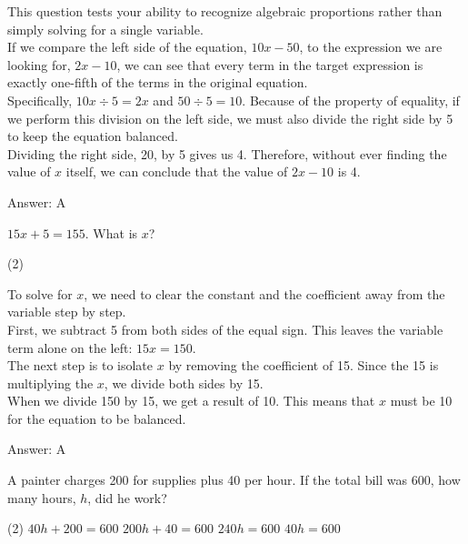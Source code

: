 \documentclass[11pt,paper=a4,answers]{exam}
\begin{document}
\begin{questions}
\begin{solution}
This question tests your ability to recognize algebraic proportions rather than simply solving for a single variable. 
\\[10pt]
If we compare the left side of the equation, $10x - 50$, to the expression we are looking for, $2x - 10$, we can see that every term in the target expression is exactly one-fifth of the terms in the original equation. 
\\[10pt]
Specifically, $10x \div 5 = 2x$ and $50 \div 5 = 10$. Because of the property of equality, if we perform this division on the left side, we must also divide the right side by 5 to keep the equation balanced. 
\\[10pt]
Dividing the right side, 20, by 5 gives us 4. Therefore, without ever finding the value of $x$ itself, we can conclude that the value of $2x - 10$ is 4.

\vspace{15pt}
Answer: \colorbox{yellow!100}{A}
\end{solution}

\question
$15x + 5 = 155$. What is $x$?
\begin{tasks}(2)
\end{tasks}

\begin{solution}
To solve for $x$, we need to clear the constant and the coefficient away from the variable step by step. 
\\[10pt]
First, we subtract 5 from both sides of the equal sign. This leaves the variable term alone on the left: $15x = 150$. 
\\[10pt]
The next step is to isolate $x$ by removing the coefficient of 15. Since the 15 is multiplying the $x$, we divide both sides by 15. 
\\[10pt]
When we divide 150 by 15, we get a result of 10. This means that $x$ must be 10 for the equation to be balanced.

\vspace{15pt}
Answer: \colorbox{yellow!100}{A}
\end{solution}

\question
A painter charges 200 for supplies plus 40 per hour. If the total bill was 600, how many hours, $h$, did he work?
\begin{tasks}(2)
    \task $40h + 200 = 600$
    \task $200h + 40 = 600$
    \task $240h = 600$
    \task $40h = 600$
\end{tasks}


\end{questions}
\end{document}

